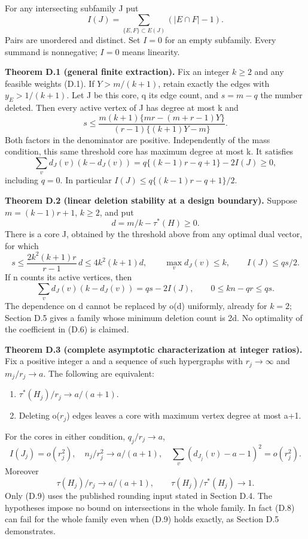 \documentclass[
  11pt,
]{article}
\providecommand{\tightlist}{%
  \setlength{\itemsep}{0pt}\setlength{\parskip}{0pt}}
\begin{document}
For any intersecting subfamily J put \[
 I(J)=\sum_{\{E,F\}\subset E(J)}(|E\cap F|-1).                  \tag{D.2}
\] Pairs are unordered and distinct. Set \(I=0\) for an empty subfamily.
Every summand is nonnegative; \(I=0\) means linearity.

\textbf{Theorem D.1 (general finite extraction).} Fix an integer
\(k\ge2\) and any feasible weights (D.1). If \(Y>m/(k+1)\), retain
exactly the edges with \(y_E>1/(k+1)\). Let J be this core, q its edge
count, and \(s=m-q\) the number deleted. Then every active vertex of J
has degree at most k and \[
 s\le \frac{m(k+1)\{mr-(m+r-1)Y\}}
              {(r-1)\{(k+1)Y-m\}}.                          \tag{D.3}
\] Both factors in the denominator are positive. Independently of the
mass condition, this same threshold core has maximum degree at most k.
It satisfies \[
 \sum_v d_J(v)(k-d_J(v))
       =q\{(k-1)r-q+1\}-2I(J)\ge0,                          \tag{D.4}
\] including \(q=0\). In particular \(I(J)\le q\{(k-1)r-q+1\}/2\).

\textbf{Theorem D.2 (linear deletion stability at a design boundary).}
Suppose \(m=(k-1)r+1\), \(k\ge2\), and put \[
                     d=m/k-\tau^*(H)\ge0.                  \tag{D.5}
\] There is a core J, obtained by the threshold above from any optimal
dual vector, for which \[
 s\le\frac{2k^2(k+1)r}{r-1}\,d\le4k^2(k+1)d,
 \qquad \max_v d_J(v)\le k,\qquad I(J)\le qs/2.             \tag{D.6}
\] If n counts its active vertices, then \[
 \sum_v d_J(v)(k-d_J(v))=qs-2I(J),\qquad
                     0\le kn-qr\le qs.                    \tag{D.7}
\] The dependence on d cannot be replaced by o(d) uniformly, already for
\(k=2\); Section D.5 gives a family whose minimum deletion count is 2d.
No optimality of the coefficient in (D.6) is claimed.

\textbf{Theorem D.3 (complete asymptotic characterization at integer
ratios).} Fix a positive integer a and a sequence of such hypergraphs
with \(r_j\to\infty\) and \(m_j/r_j\to a\). The following are
equivalent:

\begin{enumerate}
\def\labelenumi{\arabic{enumi}.}
\tightlist
\item
  \(\tau^*(H_j)/r_j\to a/(a+1)\).
\item
  Deleting o(\(r_j\)) edges leaves a core with maximum vertex degree at
  most a+1.
\end{enumerate}

For the cores in either condition, \(q_j/r_j\to a\), \[
 I(J_j)=o(r_j^2),\quad
 n_j/r_j^2\to a/(a+1),\quad
 \sum_v(d_{J_j}(v)-a-1)^2=o(r_j^2).                          \tag{D.8}
\] Moreover \[
              \tau(H_j)/r_j\to a/(a+1),\qquad
                         \tau(H_j)/\tau^*(H_j)\to1.        \tag{D.9}
\] Only (D.9) uses the published rounding input stated in Section D.4.
The hypotheses impose no bound on intersections in the whole family. In
fact (D.8) can fail for the whole family even when (D.9) holds exactly,
as Section D.5 demonstrates.
\end{document}
